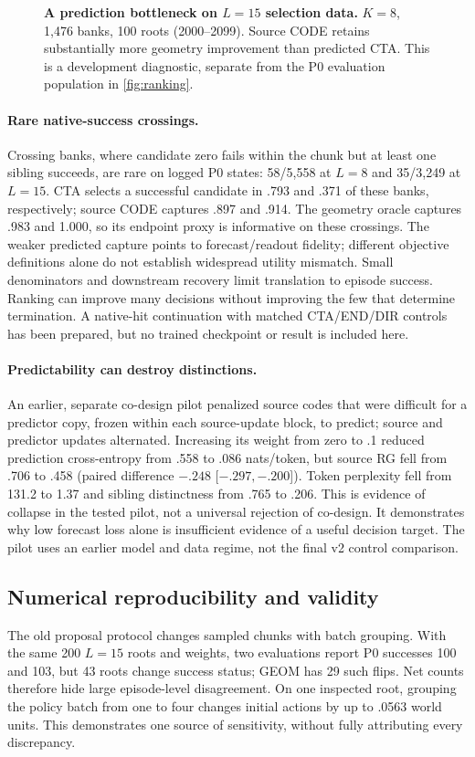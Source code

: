 \begin{figure}[t]
\centering
\caption{\textbf{A prediction bottleneck on $L=15$ selection data.} $K=8$, 1,476 banks, 100 roots (2000--2099). Source CODE retains substantially more geometry improvement than predicted CTA. This is a development diagnostic, separate from the P0 evaluation population in \cref{fig:ranking}.}
\label{fig:bottleneck}
\end{figure}

\paragraph{Rare native-success crossings.}
Crossing banks, where candidate zero fails within the chunk but at least one sibling succeeds, are rare on logged P0 states: 58/5,558 at $L=8$ and 35/3,249 at $L=15$. CTA selects a successful candidate in .793 and .371 of these banks, respectively; source CODE captures .897 and .914. The geometry oracle captures .983 and 1.000, so its endpoint proxy is informative on these crossings. The weaker predicted capture points to forecast/readout fidelity; different objective definitions alone do not establish widespread utility mismatch. Small denominators and downstream recovery limit translation to episode success. Ranking can improve many decisions without improving the few that determine termination. A native-hit continuation with matched CTA/END/DIR controls has been prepared, but no trained checkpoint or result is included here.

\paragraph{Predictability can destroy distinctions.}
An earlier, separate co-design pilot penalized source codes that were difficult for a predictor copy, frozen within each source-update block, to predict; source and predictor updates alternated. Increasing its weight from zero to .1 reduced prediction cross-entropy from .558 to .086 nats/token, but source RG fell from .706 to .458 (paired difference $-.248$ [$-.297,-.200$]). Token perplexity fell from 131.2 to 1.37 and sibling distinctness from .765 to .206. This is evidence of collapse in the tested pilot, not a universal rejection of co-design. It demonstrates why low forecast loss alone is insufficient evidence of a useful decision target. The pilot uses an earlier model and data regime, not the final v2 control comparison.

\subsection{Numerical reproducibility and validity}
\label{sec:repro}
The old proposal protocol changes sampled chunks with batch grouping. With the same 200 $L=15$ roots and weights, two evaluations report P0 successes 100 and 103, but 43 roots change success status; GEOM has 29 such flips. Net counts therefore hide large episode-level disagreement. On one inspected root, grouping the policy batch from one to four changes initial actions by up to .0563 world units. This demonstrates one source of sensitivity, without fully attributing every discrepancy.

